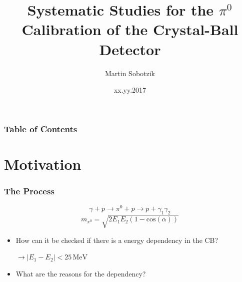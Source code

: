 \documentclass[slidestop,compress,mathserif]{beamer}
\title{Systematic Studies for the $\pi^0$ Calibration of the Crystal-Ball Detector}
\author{Martin Sobotzik}
\institute{Johannes Gutenberg-Universit\"at Mainz}
\date{xx.yy.2017}
\begin{document}
 

\begin{frame} 
\titlepage 
\end{frame} 


\begin{frame} 
\frametitle{Table of Contents} 
\tableofcontents[currentsection]
\end{frame} 
\section{Motivation}
\begin{frame}

		\frametitle{The Process}
	
		\begin{equation}
			\gamma + p \rightarrow \pi^0 +p \rightarrow p + \gamma_1 \gamma_2
		\end{equation}
		\begin{equation}
		m_{\pi^0}=\sqrt{2 E_1E_2(1-\text{cos}(\alpha))}
		\end{equation}
		\pause
			\begin{itemize}
		\item How can it be checked if there is a energy dependency in the CB?
		\pause
		 
		 
		 $\rightarrow |E_1 - E_2|<25\,\text{MeV}$
		\pause

		\item What are the reasons for the dependency?
	\end{itemize}
\end{frame}
\end{document}
